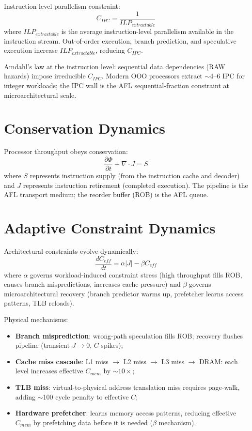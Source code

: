 \documentclass[11pt]{article}
\begin{document}
Instruction-level parallelism constraint:
\begin{equation}
C_{IPC} = \frac{1}{ILP_{extractable}}
\end{equation}
where $ILP_{extractable}$ is the average instruction-level parallelism available in the
instruction stream. Out-of-order execution, branch prediction, and speculative execution
increase $ILP_{extractable}$, reducing $C_{IPC}$.

Amdahl's law at the instruction level: sequential data dependencies (RAW hazards) impose
irreducible $C_{IPC}$. Modern OOO processors extract $\sim$4--6 IPC for integer workloads;
the IPC wall is the AFL sequential-fraction constraint at microarchitectural scale.

\section{Conservation Dynamics}

Processor throughput obeys conservation:
\begin{equation}
\frac{\partial \Phi}{\partial t} + \nabla \cdot J = S
\end{equation}
where $S$ represents instruction supply (from the instruction cache and decoder) and $J$
represents instruction retirement (completed execution). The pipeline is the AFL transport
medium; the reorder buffer (ROB) is the AFL queue.

\section{Adaptive Constraint Dynamics}

Architectural constraints evolve dynamically:
\begin{equation}
\frac{dC_{eff}}{dt} = \alpha |J| - \beta C_{eff}
\end{equation}
where $\alpha$ governs workload-induced constraint stress (high throughput fills ROB, causes
branch mispredictions, increases cache pressure) and $\beta$ governs microarchitectural
recovery (branch predictor warms up, prefetcher learns access patterns, TLB reloads).

Physical mechanisms:
\begin{itemize}
    \item \textbf{Branch misprediction}: wrong-path speculation fills ROB; recovery flushes
          pipeline (transient $J \to 0$, $C$ spikes);
    \item \textbf{Cache miss cascade}: L1 miss $\to$ L2 miss $\to$ L3 miss $\to$ DRAM: each level
          increases effective $C_{mem}$ by $\sim10\times$;
    \item \textbf{TLB miss}: virtual-to-physical address translation miss requires page-walk,
          adding $\sim$100 cycle penalty to effective $C$;
    \item \textbf{Hardware prefetcher}: learns memory access patterns, reducing effective
          $C_{mem}$ by prefetching data before it is needed ($\beta$ mechanism).
\end{itemize}
\end{document}
